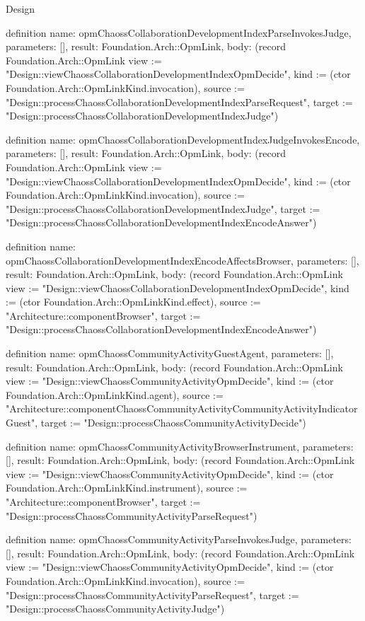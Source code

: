 \begin{lexlean}{Design}
\begin{semanticmodule}
definition{
  name: opmChaossCollaborationDevelopmentIndexParseInvokesJudge,
  parameters: [],
  result: Foundation.Arch::OpmLink,
  body: (record Foundation.Arch::OpmLink {view := "Design::viewChaossCollaborationDevelopmentIndexOpmDecide", kind := (ctor Foundation.Arch::OpmLinkKind.invocation), source := "Design::processChaossCollaborationDevelopmentIndexParseRequest", target := "Design::processChaossCollaborationDevelopmentIndexJudge"})
}

definition{
  name: opmChaossCollaborationDevelopmentIndexJudgeInvokesEncode,
  parameters: [],
  result: Foundation.Arch::OpmLink,
  body: (record Foundation.Arch::OpmLink {view := "Design::viewChaossCollaborationDevelopmentIndexOpmDecide", kind := (ctor Foundation.Arch::OpmLinkKind.invocation), source := "Design::processChaossCollaborationDevelopmentIndexJudge", target := "Design::processChaossCollaborationDevelopmentIndexEncodeAnswer"})
}

definition{
  name: opmChaossCollaborationDevelopmentIndexEncodeAffectsBrowser,
  parameters: [],
  result: Foundation.Arch::OpmLink,
  body: (record Foundation.Arch::OpmLink {view := "Design::viewChaossCollaborationDevelopmentIndexOpmDecide", kind := (ctor Foundation.Arch::OpmLinkKind.effect), source := "Architecture::componentBrowser", target := "Design::processChaossCollaborationDevelopmentIndexEncodeAnswer"})
}

definition{
  name: opmChaossCommunityActivityGuestAgent,
  parameters: [],
  result: Foundation.Arch::OpmLink,
  body: (record Foundation.Arch::OpmLink {view := "Design::viewChaossCommunityActivityOpmDecide", kind := (ctor Foundation.Arch::OpmLinkKind.agent), source := "Architecture::componentChaossCommunityActivityCommunityActivityIndicatorGuest", target := "Design::processChaossCommunityActivityDecide"})
}

definition{
  name: opmChaossCommunityActivityBrowserInstrument,
  parameters: [],
  result: Foundation.Arch::OpmLink,
  body: (record Foundation.Arch::OpmLink {view := "Design::viewChaossCommunityActivityOpmDecide", kind := (ctor Foundation.Arch::OpmLinkKind.instrument), source := "Architecture::componentBrowser", target := "Design::processChaossCommunityActivityParseRequest"})
}

definition{
  name: opmChaossCommunityActivityParseInvokesJudge,
  parameters: [],
  result: Foundation.Arch::OpmLink,
  body: (record Foundation.Arch::OpmLink {view := "Design::viewChaossCommunityActivityOpmDecide", kind := (ctor Foundation.Arch::OpmLinkKind.invocation), source := "Design::processChaossCommunityActivityParseRequest", target := "Design::processChaossCommunityActivityJudge"})
}


\end{semanticmodule}
\end{lexlean}
